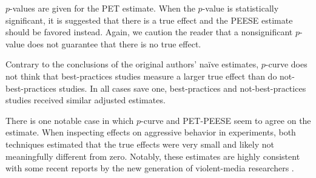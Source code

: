 \documentclass[man]{apa6}
\begin{document}
$p$-values are given for the PET estimate. When the $p$-value is statistically significant, it is suggested that there is a true effect and the PEESE estimate should be favored instead. Again, we caution the reader that a nonsignificant $p$-value does not guarantee that there is no true effect.  

Contrary to the conclusions of the original authors' na{\"i}ve estimates, $p$-curve does not think that best-practices studies measure a larger true effect than do not-best-practices studies. In all cases save one, best-practices and not-best-practices studies received similar adjusted estimates. 


There is one notable case in which $p$-curve and PET-PEESE seem to agree on the estimate. When inspecting effects on aggressive behavior in experiments, both techniques estimated that the true effects were very small and likely not meaningfully different from zero. Notably, these estimates are highly consistent with some recent reports by the new generation of violent-media researchers \citep{Engelhardt:etal:2015,Hilgard:2015,Kneer:etal:inpress,Przybylski:etal:2014}.


\end{document}
